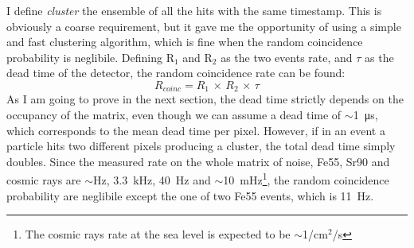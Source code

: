         I define \emph{cluster} the ensemble of all the hits with the same timestamp. This is obviously a coarse requirement, but it gave me the opportunity of using a simple and fast clustering algorithm, which is fine when the random coincidence probability is neglibile. 
        Defining R$_1$ and R$_2$ as the two events rate, and $\tau$ as the dead time of the detector, the random coincidence rate can be found: 
        \begin{equation}
            R_{coinc} = R_1 \, \times\, R_2 \, \times \, \tau
        \end{equation}
        As I am going to prove in the next section, the dead time strictly depends on the occupancy of the matrix, even though we can assume a dead time of $\sim$\SI{1}{\us}, which corresponds to the mean dead time per pixel. However, if in an event a particle hits two different pixels producing a cluster, the total dead time simply doubles. 
        Since the measured rate on the whole matrix of noise, Fe55, Sr90 and cosmic rays are $\sim$\si{Hz}, \SI{3.3}{kHz}, \SI{40}{Hz} and $\sim$\SI{10}{mHz}\footnote{The cosmic rays rate at the sea level is expected to be $\sim$1/cm$^2$/s}, the random coincidence probability are neglibile except the one of two Fe55 events, which is \SI{11}{Hz}.
        
